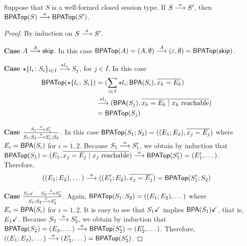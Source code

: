 \begin{lemma}\label{lemma:bisimulation-BPA-forwards}
  Suppose that $S$ is a well-formed closed session type.  If
  $S \LTSderives S'$, then $\toBPATop{S} \LTSderives \toBPATop{S'}$.
\end{lemma}
\begin{proof}
  By induction on  $S \LTSderives S'$.

  \textbf{Case }$A \LTSderives[A] \skipk$.
  In this case $\toBPATop{A} = (A, \emptyset) \LTSderives[A] (\varepsilon, \emptyset) = \toBPATop{\skipk}$.

  \textbf{Case }$\star\{l_i\colon S_i\}_{i\in I} \LTSderives[\star
  l_j] S_j$, for $j\in I$.  In
  this case
  \begin{align*}
    \toBPATop{\star\{l_i\colon S_i\}}
    & =(\sum_{i\in I} \star l_i; \toBPA{S_i},
      \overline{x_k = E_k}) \\
    & \LTSderives [\star l_j]
      (\toBPA{S_j}, \overline{x_k = E_k \mid x_k \text{ reachable}}) \\
    & =  \toBPATop{S_j}
  \end{align*}

  \begin{sloppypar}
    \textbf{Case
    }$\frac{S_1 \LTSderives S_1'}{S_1; S_2 \LTSderives S_1';S_2}$.  In
    this case
    $ \toBPATop{S_1;S_2} = ((E_1; E_2), \overline{x_j = E_j}) $
%
    where $E_i = \toBPA{S_i}$ for $i=1,2$.  Because
    $S_1 \LTSderives S_1'$, we obtain by induction that
    $\toBPATop{S_1} = (E_1, \overline{x_j = E_j \mid x_j\text{
        reachable}}) \LTSderives \toBPATop{S_1'} = (E_1', \dots)$.
    Therefore,
    $$((E_1;E_2), \dots) \LTSderives ((E_1';E_2), \overline{x_j =
      E_j}) = \toBPATop{S_1'; S_2}$$
  \end{sloppypar}

  \begin{sloppypar}
    \textbf{Case
    }$\frac{\DONE{S_1} \quad S_2 \LTSderives S_2'}{S_1; S_2
      \LTSderives S_2'}$.
    Again, $\toBPATop{S_1;S_2} = ((E_1;E_2), \dots)$ where
    $E_i = \toBPA{S_i}$ for $i=1,2$.  It is easy to see that
    $\DONE{S_1}$ implies $\DONE{\toBPA{S_1}}$, that is, $\DONE{E_1}$.
    Because $S_2 \LTSderives S_2'$, we obtain by induction that
    $\toBPATop{S_2} = (E_2, \dots) \LTSderives \toBPATop{S_2'} = (
    E_2', \dots)$.
    Therefore,
    $(( E_1;E_2), \dots) \LTSderives (E_2', \dots) = \toBPATop{S_2'}$.
  \end{sloppypar}


\end{proof}
